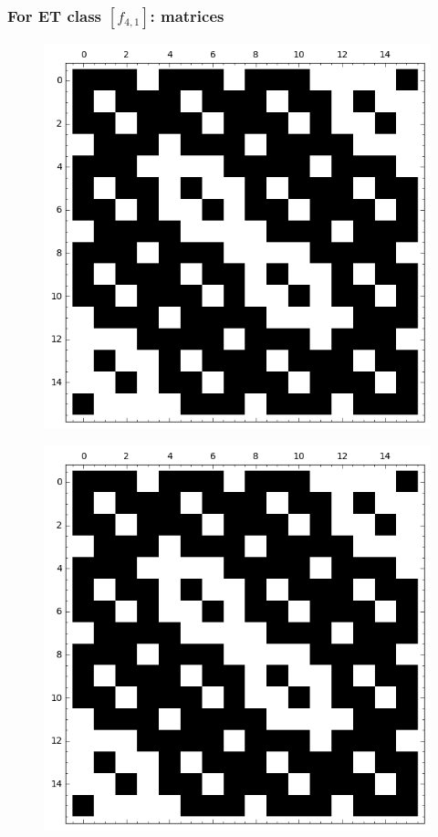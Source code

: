\documentclass[pdf,sprung,slideColor,nocolorBG]{beamer}
\begin{document}
\begin{frame}
\frametitle{For ET class $[f_{4,1}]$: matrices}
\begin{figure}
\centering
\begin{minipage}{.48\textwidth}
  \centering
  \includegraphics[width=.9\linewidth]{../matrix_plot/c4_1_weight_class_matrix.png}
  \label{fig:c4_1_weight_class_matrix}
\end{minipage}%
\begin{minipage}{.48\textwidth}
  \centering
  \includegraphics[width=.9\linewidth]{../matrix_plot/c4_1_bent_cayley_graph_index_matrix.png}
  \label{fig:c4_1_bent_cayley_graph_index_matrix}
\end{minipage}
\end{figure}
\end{frame}
\end{document}
